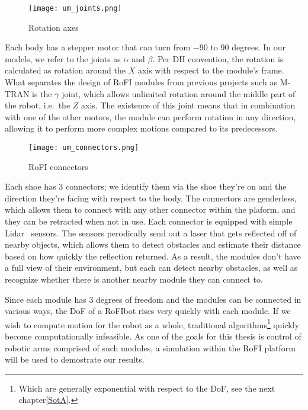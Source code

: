 \begin{wrapfigure}{l}{0.3\textwidth}
    \centering
    \texttt{[image: um\_joints.png]}
  \caption{Rotation axes~\cite{rofiUm}}\label{fig:um_rot}
\end{wrapfigure}

Each body has a stepper motor that can turn from $-90$ to $90$ degrees. In our models, we refer to the joints as $\alpha$ and $\beta$. Per DH convention, the rotation is calculated as rotation around the $X$ axis with respect to the module's frame. What separates the design of RoFI modules from previous projects such as M-TRAN is the $\gamma$ joint, which allows unlimited rotation around the middle part of the robot, i.e.\ the $Z$ axis. The existence of this joint means that in combination with one of the other motors, the module can perform rotation in any direction, allowing it to perform more complex motions compared to its predecessors.

\begin{wrapfigure}{r}{0.38\textwidth}
    \centering
    \texttt{[image: um\_connectors.png]}
  \caption{RoFI connectors~\cite{rofiUm}}\label{fig:um_con}
\end{wrapfigure}

Each shoe has 3 connectors; we identify them via the shoe they're on and the direction they're facing with respect to the body. The connectors are genderless, which allows them to connect with any other connector within the plaform, and they can be retracted when not in use. Each connector is equipped with simple Lidar~\cite{Lidar} sensors. The sensors perodically send out a laser that gets reflected off of nearby objects, which allows them to detect obstacles and estimate their distance based on how quickly the reflection returned. As a result, the modules don't have a full view of their environment, but each can detect nearby obstacles, as well as recognize whether there is another nearby module they can connect to.

Since each module has 3 degrees of freedom and the modules can be connected in various ways, the DoF of a RoFIbot rises very quickly with each module. If we wish to compute motion for the robot as a whole, traditional algorithms\footnote{Which are generally exponential with respect to the DoF, see the next chapter\ref{SotA}.} quickly become computationally infeasible. As one of the goals for this thesis is control of robotic arms comprised of such modules, a simulation within the RoFI platform will be used to demostrate our results.
